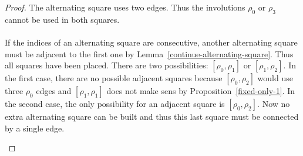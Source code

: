 \begin{proof}
  The alternating square uses two edges. Thus the involutions $\rho_0$ or $\rho_3$ cannot be used in both squares.

  \paragraph{}
  If the indices of an alternating square are consecutive, another alternating square must be adjacent to the first one by Lemma~\ref{continue-alternating-square}. Thus all squares have been placed. There are two possibilities: $[\rho_0, \rho_1]$ or $[\rho_1, \rho_2]$. In the first case, there are no possible adjacent squares because $[\rho_0, \rho_2]$ would use three $\rho_0$ edges and $[\rho_1, \rho_1]$ does not make sens by Proposition~\ref{fixed-only-1}. In the second case, the only possibility for an adjacent square is $[\rho_0, \rho_2]$. Now no extra alternating square can be built and thus this last square must be connected by a single edge.

  \begin{figure}[H]
    \begin{center}
\end{center}
\end{figure}
\end{proof}
